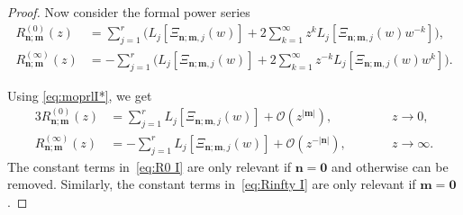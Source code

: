 \documentclass[reqno,centertags,11pt,draft]{amsart}
\begin{document}
\begin{proof}
    
    
    Now consider the formal power series
    \begin{align}
    \label{eq:secondKindFunctionTypeI 1}
    R^{(0)}_{\bm{n};\bm{m}}(z) 
    & = \sum_{j=1}^r \Big( L_j[\Xi_{\bm{n};\bm{m},j}(w)]+ 2\sum_{k=1}^\infty z^k L_j[\Xi_{\bm{n};\bm{m},j}(w) w^{-k}] \Big) , %
    \\
    \label{eq:secondKindFunctionTypeI 2}
     R^{(\infty)}_{\bm{n};\bm{m}}(z)   & =     - \sum_{j=1}^r \Big( L_j[\Xi_{\bm{n};\bm{m},j}(w)] +
            2\sum_{k=1}^\infty z^{-k} L_j[\Xi_{\bm{n};\bm{m},j}(w) w^{k}] \Big). %
    \end{align}

    Using \eqref{eq:moprlI*}, we get 
    \begin{alignat}{3}\label{eq:R0 I}
        R_{\bm{n};\bm{m}}^{(0)}(z) & = \sum_{j=1}^r  L_j[\Xi_{\bm{n};\bm{m},j}(w)] + 
        \mathcal{O}(z^{|\bm{m}|}), \qquad && z \to 0,
        \\
        \label{eq:Rinfty I}
        R_{\bm{n};\bm{m}}^{(\infty)}(z)
        & = 
         - \sum_{j=1}^r  L_j[\Xi_{\bm{n};\bm{m},j}(w)] +
         \mathcal{O}(z^{-|\bm{n}|}), \qquad && z \to \infty.
     \end{alignat}
    The constant terms in~\eqref{eq:R0 I} are only relevant if $\bm{n}=\bm{0}$ and otherwise can be removed. Similarly, the constant terms
    in~\eqref{eq:Rinfty I} are only relevant if $\bm{m}=\bm{0}$. 


\end{proof}
\end{document}
